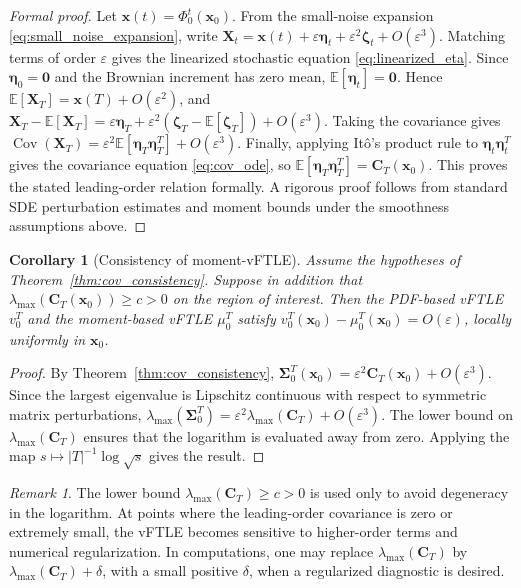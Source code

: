 \documentclass[a4paper,11pt]{article}
\numberwithin{equation}{section}
\theoremstyle{plain}
\newtheorem{corollary}[theorem]{Corollary}
\theoremstyle{definition}
\theoremstyle{remark}
\newtheorem{remark}[theorem]{Remark}
\newcommand{\bx}{\mathbf{x}}
\newcommand{\bX}{\mathbf{X}}
\newcommand{\bC}{\mathbf{C}}
\newcommand{\bzero}{\mathbf{0}}
\newcommand{\bSigma}{\boldsymbol{\Sigma}}
\newcommand{\etaVec}{\boldsymbol{\eta}}
\newcommand{\E}{\mathbb{E}}
\newcommand{\Cov}{\operatorname{Cov}}
\newcommand{\lmax}{\lambda_{\max}}
\newcommand{\flow}[2]{\Phi_{#1}^{#2}}
\begin{document}
\begin{proof}[Formal proof]
Let \(\bx(t)=\flow{0}{t}(\bx_0)\).  From the small-noise expansion \eqref{eq:small_noise_expansion}, write \(\bX_t=\bx(t)+\varepsilon\etaVec_t+\varepsilon^2\boldsymbol{\zeta}_t+O(\varepsilon^3)\).  Matching terms of order \(\varepsilon\) gives the linearized stochastic equation \eqref{eq:linearized_eta}.  Since \(\etaVec_0=\bzero\) and the Brownian increment has zero mean, \(\E[\etaVec_t]=\bzero\).  Hence \(\E[\bX_T]=\bx(T)+O(\varepsilon^2)\), and \(\bX_T-\E[\bX_T]=\varepsilon\etaVec_T+\varepsilon^2(\boldsymbol{\zeta}_T-\E[\boldsymbol{\zeta}_T])+O(\varepsilon^3)\).  Taking the covariance gives \(\Cov(\bX_T)=\varepsilon^2\E[\etaVec_T\etaVec_T^T]+O(\varepsilon^3)\).  Finally, applying It\^o's product rule to \(\etaVec_t\etaVec_t^T\) gives the covariance equation \eqref{eq:cov_ode}, so \(\E[\etaVec_T\etaVec_T^T]=\bC_T(\bx_0)\).  This proves the stated leading-order relation formally.  A rigorous proof follows from standard SDE perturbation estimates and moment bounds under the smoothness assumptions above.
\end{proof}

\begin{corollary}[Consistency of moment-vFTLE]\label{cor:mvftle_consistency}
Assume the hypotheses of Theorem~\ref{thm:cov_consistency}.  Suppose in addition that \(\lmax(\bC_T(\bx_0))\geq c>0\) on the region of interest.  Then the PDF-based vFTLE \(v_0^T\) and the moment-based vFTLE \(\mu_0^T\) satisfy \(v_0^T(\bx_0)-\mu_0^T(\bx_0)=O(\varepsilon)\), locally uniformly in \(\bx_0\).
\end{corollary}

\begin{proof}
By Theorem~\ref{thm:cov_consistency}, \(\bSigma_0^T(\bx_0)=\varepsilon^2\bC_T(\bx_0)+O(\varepsilon^3)\).  Since the largest eigenvalue is Lipschitz continuous with respect to symmetric matrix perturbations, \(\lmax(\bSigma_0^T)=\varepsilon^2\lmax(\bC_T)+O(\varepsilon^3)\).  The lower bound on \(\lmax(\bC_T)\) ensures that the logarithm is evaluated away from zero.  Applying the map \(s\mapsto |T|^{-1}\log\sqrt{s}\) gives the result.
\end{proof}

\begin{remark}
The lower bound \(\lmax(\bC_T)\geq c>0\) is used only to avoid degeneracy in the logarithm.  At points where the leading-order covariance is zero or extremely small, the vFTLE becomes sensitive to higher-order terms and numerical regularization.  In computations, one may replace \(\lmax(\bC_T)\) by \(\lmax(\bC_T)+\delta\), with a small positive \(\delta\), when a regularized diagnostic is desired.
\end{remark}
\end{document}
